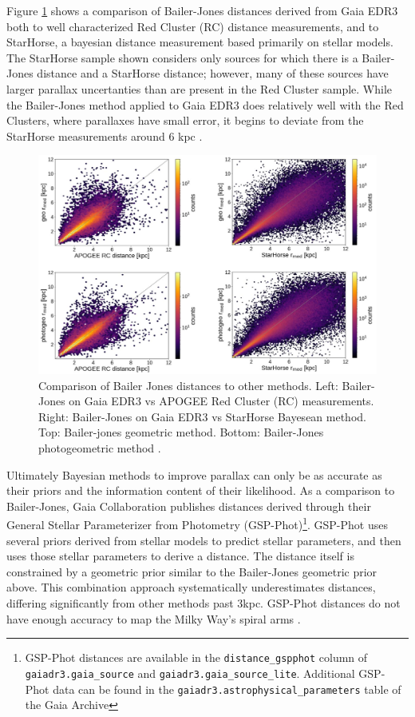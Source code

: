 \documentclass[preprint2]{aastex631}
\begin{document}
Figure \ref{fig:bailerjones} shows a comparison of Bailer-Jones distances derived from Gaia EDR3 both to well characterized Red Cluster (RC) distance measurements, and to StarHorse, a bayesian distance measurement based primarily on stellar models\cite{queirozStarHorse2018}. The StarHorse sample shown considers only sources for which there is a Bailer-Jones distance and a StarHorse distance; however, many of these sources have larger parallax uncertanties than are present in the Red Cluster sample.  While the Bailer-Jones method applied to Gaia EDR3 does relatively well with the Red Clusters, where parallaxes have small error, it begins to deviate from the StarHorse measurements around 6 kpc \cite{bailer-jonesEstimating2021}. 
\begin{figure}
	\includegraphics[width=\columnwidth]{bailerjonesverification.png}
	\caption{Comparison of Bailer Jones distances to other methods. Left: Bailer-Jones on Gaia EDR3 vs APOGEE Red Cluster (RC) measurements. Right: Bailer-Jones on Gaia EDR3 vs StarHorse Bayesean method. Top: Bailer-jones geometric method. Bottom: Bailer-Jones photogeometric method \citep{bailer-jonesEstimating2021}.}
	\label{fig:bailerjones}
\end{figure}

Ultimately Bayesian methods to improve parallax can only be as accurate as their priors and the information content of their likelihood. As a comparison to Bailer-Jones, Gaia Collaboration publishes distances derived through their General Stellar Parameterizer from Photometry (GSP-Phot)\footnote{GSP-Phot distances are available in the \texttt{distance\_gspphot} column of \texttt{gaiadr3.gaia\_source} and \texttt{gaiadr3.gaia\_source\_lite}. Additional GSP-Phot data can be found in the \texttt{gaiadr3.astrophysical\_parameters} table of the Gaia Archive}. GSP-Phot uses several priors derived from stellar models to predict stellar parameters, and then uses those stellar parameters to derive a distance. The distance itself is constrained by a geometric prior similar to the Bailer-Jones geometric prior above. This combination approach systematically underestimates distances, differing significantly from other methods past 3kpc. GSP-Phot distances do not have enough accuracy to map the Milky Way's spiral arms \citep{andraeGaia2022}.
\end{document}
